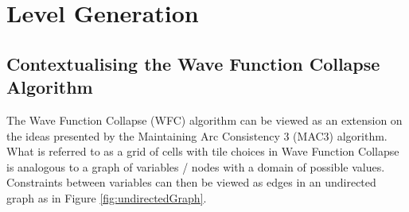 



\section{Level Generation}
\subsection{Contextualising the Wave Function Collapse Algorithm}
The Wave Function Collapse (WFC) algorithm can be viewed as an extension on the ideas presented by the Maintaining Arc Consistency 3 (MAC3) algorithm. What is referred to as a grid of cells with tile choices in Wave Function Collapse is analogous to a graph of variables / nodes with a domain of possible values. Constraints between variables can then be viewed as edges in an undirected graph as in Figure \ref{fig:undirectedGraph}.



